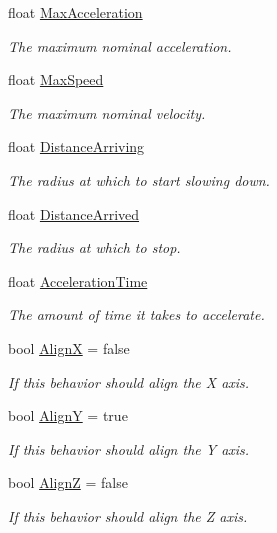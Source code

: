 \begin{DoxyCompactItemize}
\item 
float \hyperlink{class_skyrates_1_1_a_i_1_1_steering_1_1_basic_1_1_align_aff428814e7bf994867c87529038646e3}{Max\-Acceleration}
\begin{DoxyCompactList}\small\item\em The maximum nominal acceleration. \end{DoxyCompactList}\item 
float \hyperlink{class_skyrates_1_1_a_i_1_1_steering_1_1_basic_1_1_align_ab4911f80787556c63910b546e9483215}{Max\-Speed}
\begin{DoxyCompactList}\small\item\em The maximum nominal velocity. \end{DoxyCompactList}\item 
float \hyperlink{class_skyrates_1_1_a_i_1_1_steering_1_1_basic_1_1_align_a6a9abaf9ec2bfd07b94ed22cb2b76be3}{Distance\-Arriving}
\begin{DoxyCompactList}\small\item\em The radius at which to start slowing down. \end{DoxyCompactList}\item 
float \hyperlink{class_skyrates_1_1_a_i_1_1_steering_1_1_basic_1_1_align_aebe4c4ec6eecb5fa713deee7c8dfa64d}{Distance\-Arrived}
\begin{DoxyCompactList}\small\item\em The radius at which to stop. \end{DoxyCompactList}\item 
float \hyperlink{class_skyrates_1_1_a_i_1_1_steering_1_1_basic_1_1_align_a6a1a2c26444037457b99c5b8397a505e}{Acceleration\-Time}
\begin{DoxyCompactList}\small\item\em The amount of time it takes to accelerate. \end{DoxyCompactList}\item 
bool \hyperlink{class_skyrates_1_1_a_i_1_1_steering_1_1_basic_1_1_align_a6b2e44719571584f368fc6989974a242}{Align\-X} = false
\begin{DoxyCompactList}\small\item\em If this behavior should align the X axis. \end{DoxyCompactList}\item 
bool \hyperlink{class_skyrates_1_1_a_i_1_1_steering_1_1_basic_1_1_align_a1f1632ba0eb5a43d6a4704cea6f584b0}{Align\-Y} = true
\begin{DoxyCompactList}\small\item\em If this behavior should align the Y axis. \end{DoxyCompactList}\item 
bool \hyperlink{class_skyrates_1_1_a_i_1_1_steering_1_1_basic_1_1_align_af2e8dd95135f0ee24aaa8af49442b4be}{Align\-Z} = false
\begin{DoxyCompactList}\small\item\em If this behavior should align the Z axis. \end{DoxyCompactList}\end{DoxyCompactItemize}
